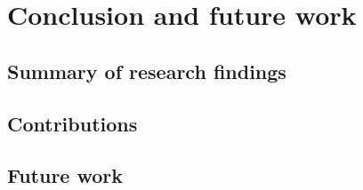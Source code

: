 \chapter{Conclusion and future work}

\section{Summary of research findings}

\section{Contributions}

\section{Future work}
